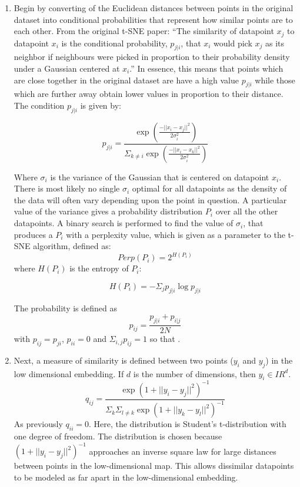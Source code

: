 \documentclass[a4paper, 12pt, twoside]{report}
\begin{document}
\begin{enumerate}
    \item Begin by converting of the Euclidean distances between points in the original dataset into conditional probabilities that represent how similar points are to each other. From the original t-SNE paper: ``The similarity of datapoint $x_{j}$ to datapoint $x_{i}$ is the conditional probability, $p_{j|i}$, that $x_{i}$ would pick $x_{j}$ as its neighbor if  neighbours were picked in proportion to their probability density under a Gaussian centered at $x_{i}$.'' In essence, this means that points which are close together in the original dataset are have a high value $p_{j|i}$ while those which are further away obtain lower values in proportion to their distance. The condition $p_{j|i}$ is given by:

    \[ p_{j|i} = \frac{\exp(\frac{-||x_{i}-x_{j}||^{2}}{2\sigma_{i}^{2}})}{\Sigma_{k \neq i}\exp(\frac{-||x_{i}-x_{k}||^{2}}{2\sigma_{i}^{2}})} \]

    Where $\sigma_{i}$ is the variance of the Gaussian that is centered on datapoint $x_{i}$. There is most likely no single $\sigma_{i}$ optimal for all datapoints as the density of the data will often vary depending upon the point in question. A particular value of the variance gives a probability distribution $P_{i}$ over all the other datapoints. A binary search is performed to find the value of $\sigma_{i}$, that produces a $P_{i}$ with a perplexity value, which is given as a parameter to the t-SNE algorithm, defined as:
    \[ Perp(P_{i}) = 2^{H(P_{i})} \]
    where $H(P_{i})$ is the entropy of $P_{i}$:

    \[ H(P_{i}) = - \Sigma_{j}p_{j|i} \log p_{j|i} \]

    The probability is defined as
    \[ p_{ij} = \frac{p_{j|i} + p_{i|j}}{2N}\]
    with $p_{ij} = p_{ji}$, $p_{ii} = 0$ and $\Sigma_{i,j}p_{ij} = 1$ so that .

    \item Next, a measure of similarity is defined between two points ($y_{i}$ and $y_{j}$) in the low dimensional embedding. If $d$ is the number of dimensions, then $y_{i} \in I\!R^{d}$.
    \[ q_{ij} = \frac{\exp(1 + ||y_{i} - y_{j}||^{2})^{-1}}{\Sigma_{k}\Sigma_{l \neq k}\exp( 1 + ||y_{k} - y_{l}||^{2})^{-1}} \]
    As previously $q_{ii} = 0$. Here, the distribution is Student's t-distribution with one degree of freedom. The distribution is chosen because $(1 + ||y_{i} - y_{j}||^{2})^{-1}$ approaches an inverse square law for large distances between points in the low-dimensional map. This allows dissimilar datapoints to be modeled as far apart in the low-dimensional embedding.


\end{enumerate}
\end{document}
